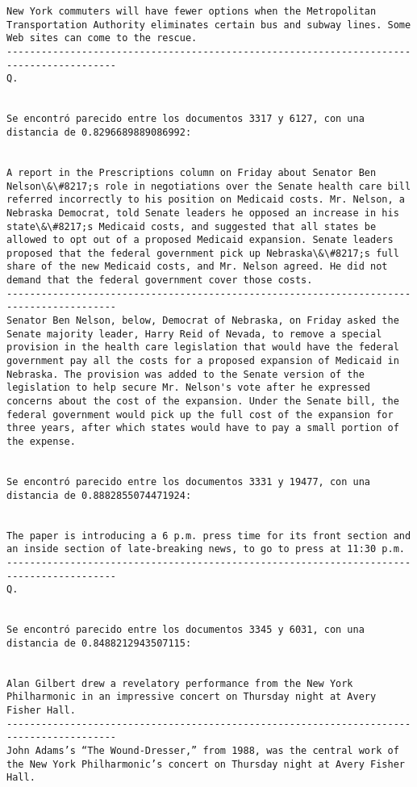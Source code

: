 \documentclass[11pt]{article}
\begin{document}
\begin{Verbatim}[commandchars=\\\{\}]
New York commuters will have fewer options when the Metropolitan Transportation Authority eliminates certain bus and subway lines. Some Web sites can come to the rescue.
-----------------------------------------------------------------------------------------
Q.


Se encontró parecido entre los documentos 3317 y 6127, con una distancia de 0.8296689889086992:


A report in the Prescriptions column on Friday about Senator Ben Nelson\&\#8217;s role in negotiations over the Senate health care bill referred incorrectly to his position on Medicaid costs. Mr. Nelson, a Nebraska Democrat, told Senate leaders he opposed an increase in his state\&\#8217;s Medicaid costs, and suggested that all states be allowed to opt out of a proposed Medicaid expansion. Senate leaders proposed that the federal government pick up Nebraska\&\#8217;s full share of the new Medicaid costs, and Mr. Nelson agreed. He did not demand that the federal government cover those costs.
-----------------------------------------------------------------------------------------
Senator Ben Nelson, below, Democrat of Nebraska, on Friday asked the Senate majority leader, Harry Reid of Nevada, to remove a special provision in the health care legislation that would have the federal government pay all the costs for a proposed expansion of Medicaid in Nebraska. The provision was added to the Senate version of the legislation to help secure Mr. Nelson's vote after he expressed concerns about the cost of the expansion. Under the Senate bill, the federal government would pick up the full cost of the expansion for three years, after which states would have to pay a small portion of the expense.


Se encontró parecido entre los documentos 3331 y 19477, con una distancia de 0.8882855074471924:


The paper is introducing a 6 p.m. press time for its front section and an inside section of late-breaking news, to go to press at 11:30 p.m.
-----------------------------------------------------------------------------------------
Q.


Se encontró parecido entre los documentos 3345 y 6031, con una distancia de 0.8488212943507115:


Alan Gilbert drew a revelatory performance from the New York Philharmonic in an impressive concert on Thursday night at Avery Fisher Hall.
-----------------------------------------------------------------------------------------
John Adams’s “The Wound-Dresser,” from 1988, was the central work of the New York Philharmonic’s concert on Thursday night at Avery Fisher Hall.



\end{Verbatim}
\end{document}
